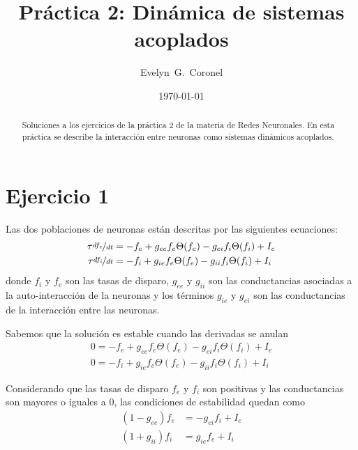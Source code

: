 
\usepackage{hyperref}


\title{Práctica 2: Dinámica de sistemas acoplados }
\author{Evelyn~G.~Coronel}


\date[]{\lowercase{\today}} %

\begin{abstract}
Soluciones a los ejercicios de la práctica 2 de la materia de Redes Neuronales. En esta práctica se describe  la interacción entre neuronas como sistemas dinámicos acoplados.
\end{abstract} 
\maketitle

\section*{Ejercicio 1}

Las dos poblaciones de neuronas  están descritas por las siguientes ecuaciones:
\begin{align}
    \tau \nicefrac{df_e}{dt} &= -f_e + g_{ee} f_e\Theta(f_e) - g_{ei}f_i\Theta(f_i) + I_e\\
    \tau \nicefrac{df_i}{dt} &= -f_i + g_{ie} f_e\Theta(f_e) - g_{ii}f_i\Theta(f_i) + I_i
\end{align}
donde $f_i$ y $f_e$ son las tasas de disparo, $g_{ee}$ y $g_{ii}$ son las conductancias asociadas a la auto-interacción de la neuronas y los términos $g_{ie}$ y $g_{ei}$ son las conductancias de la interacción entre las neuronas.

Sabemos que la solución es estable cuando las derivadas se anulan
\begin{align}
    0= -f_e + g_{ee} f_e\Theta(f_e) - g_{ei}f_i\Theta(f_i) + I_e\\
    0= -f_i + g_{ie} f_e\Theta(f_e) - g_{ii}f_i\Theta(f_i) + I_i
\end{align}

Considerando que las tasas de disparo $f_e$ y $f_i$ son positivas y las conductancias  son mayores o iguales a 0,  las condiciones de estabilidad quedan como
\begin{align}
     (1 -g_{ee}) f_e &= -g_{ei}f_i + I_e \label{fe}\\
    (1 + g_{ii}) f_i &=  g_{ie} f_e  + I_i
\end{align}

